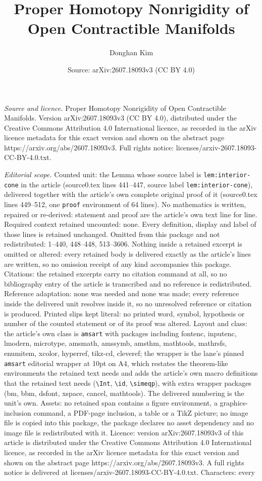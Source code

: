 \documentclass[10pt,a4paper]{amsart}
\title[Proper Homotopy Nonrigidity of Open Contractible Manifolds]{Proper Homotopy Nonrigidity of Open Contractible Manifolds}
\author{Donghan Kim}
\date{Source: arXiv:2607.18093v3 (CC BY 4.0)}
\begin{document}
\maketitle

\noindent\emph{Source and licence.} Proper Homotopy Nonrigidity of Open Contractible Manifolds. Version arXiv:2607.18093v3 (CC BY 4.0), distributed under the Creative Commons Attribution 4.0 International licence, as recorded in the arXiv licence metadata for this exact version and shown on the abstract page https://arxiv.org/abs/2607.18093v3. Full rights notice: licenses/arxiv-2607.18093-CC-BY-4.0.txt.\par\smallskip

\noindent\textit{Editorial scope.} Counted unit: the Lemma whose source label is \texttt{lem:interior-cone} in the article (source0.tex lines 441--447, source label \texttt{lem:interior-cone}), delivered together with the article's own complete original proof of it (source0.tex lines 449--512, one \texttt{proof} environment of 64 lines). No mathematics is written, repaired or re-derived: statement and proof are the article's own text line for line. Required context retained uncounted: none. Every definition, display and label of those lines is retained unchanged. Omitted from this package and not redistributed: 1--440, 448--448, 513--3606. Nothing inside a retained excerpt is omitted or altered: every retained body is delivered exactly as the article's lines are written, so no omission receipt of any kind accompanies this package. Citations: the retained excerpts carry no citation command at all, so no bibliography entry of the article is transcribed and no reference is redistributed. Reference adaptation: none was needed and none was made; every reference inside the delivered unit resolves inside it, so no unresolved reference or citation is produced. Printed slips kept literal: no printed word, symbol, hypothesis or number of the counted statement or of its proof was altered. Layout and class: the article's own class is \texttt{amsart} with packages including fontenc, inputenc, lmodern, microtype, amsmath, amssymb, amsthm, mathtools, mathrsfs, enumitem, xcolor, hyperref, tikz-cd, cleveref; the wrapper is the lane's pinned \texttt{amsart} editorial wrapper at 10pt on A4, which restates the theorem-like environments the retained text needs and adds the article's own macro definitions that the retained text needs (\texttt{\textbackslash Int}, \texttt{\textbackslash id}, \texttt{\textbackslash simeqp}), with extra wrapper packages (bm, bbm, dsfont, xspace, cancel, mathtools). The delivered numbering is the unit's own. Assets: no retained span contains a figure environment, a graphics-inclusion command, a PDF-page inclusion, a table or a TikZ picture; no image file is copied into this package, the package declares no asset dependency and no image file is redistributed with it. Licence: version arXiv:2607.18093v3 of this article is distributed under the Creative Commons Attribution 4.0 International licence, as recorded in the arXiv licence metadata for this exact version and shown on the abstract page https://arxiv.org/abs/2607.18093v3. A full rights notice is delivered at licenses/arxiv-2607.18093-CC-BY-4.0.txt. Characters: every 
\end{document}
